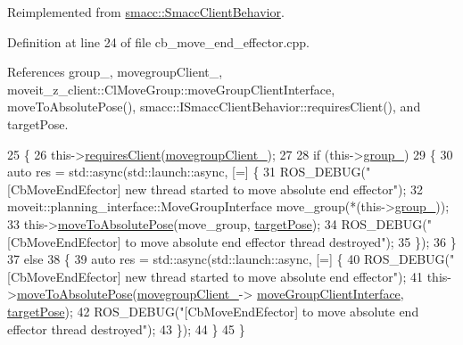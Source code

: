 Reimplemented from \hyperlink{classsmacc_1_1SmaccClientBehavior_ad5d3e1f1697c3cfe66c94cadba948493}{smacc\+::\+Smacc\+Client\+Behavior}.



Definition at line 24 of file cb\+\_\+move\+\_\+end\+\_\+effector.\+cpp.



References group\+\_\+, movegroup\+Client\+\_\+, moveit\+\_\+z\+\_\+client\+::\+Cl\+Move\+Group\+::move\+Group\+Client\+Interface, move\+To\+Absolute\+Pose(), smacc\+::\+I\+Smacc\+Client\+Behavior\+::requires\+Client(), and target\+Pose.


\begin{DoxyCode}
25 \{
26   this->\hyperlink{classsmacc_1_1ISmaccClientBehavior_a32b16e99e3b4cb289414203dc861a440}{requiresClient}(\hyperlink{classmoveit__z__client_1_1CbMoveEndEffector_af62a434c16849885a085e30b8ae70e00}{movegroupClient\_});
27 
28   \textcolor{keywordflow}{if} (this->\hyperlink{classmoveit__z__client_1_1CbMoveEndEffector_ab2d23ae054dbc0c2a5f3e6bbc84e07dd}{group\_})
29   \{
30     \textcolor{keyword}{auto} res = std::async(std::launch::async, [=] \{
31       ROS\_DEBUG(\textcolor{stringliteral}{"[CbMoveEndEfector] new thread started to move absolute end effector"});
32       moveit::planning\_interface::MoveGroupInterface move\_group(*(this->\hyperlink{classmoveit__z__client_1_1CbMoveEndEffector_ab2d23ae054dbc0c2a5f3e6bbc84e07dd}{group\_}));
33       this->\hyperlink{classmoveit__z__client_1_1CbMoveEndEffector_a277108330d114671ed89dffb876a8a48}{moveToAbsolutePose}(move\_group, \hyperlink{classmoveit__z__client_1_1CbMoveEndEffector_abea9c6077733077baced34c6098c6140}{targetPose});
34       ROS\_DEBUG(\textcolor{stringliteral}{"[CbMoveEndEfector] to move absolute end effector thread destroyed"});
35     \});
36   \}
37   \textcolor{keywordflow}{else}
38   \{
39     \textcolor{keyword}{auto} res = std::async(std::launch::async, [=] \{
40       ROS\_DEBUG(\textcolor{stringliteral}{"[CbMoveEndEfector] new thread started to move absolute end effector"});
41       this->\hyperlink{classmoveit__z__client_1_1CbMoveEndEffector_a277108330d114671ed89dffb876a8a48}{moveToAbsolutePose}(\hyperlink{classmoveit__z__client_1_1CbMoveEndEffector_af62a434c16849885a085e30b8ae70e00}{movegroupClient\_}->
      \hyperlink{classmoveit__z__client_1_1ClMoveGroup_af86e046b837be0ef4afa9893d8808f20}{moveGroupClientInterface}, \hyperlink{classmoveit__z__client_1_1CbMoveEndEffector_abea9c6077733077baced34c6098c6140}{targetPose});
42       ROS\_DEBUG(\textcolor{stringliteral}{"[CbMoveEndEfector] to move absolute end effector thread destroyed"});
43     \});
44   \}
45 \}
\end{DoxyCode}

